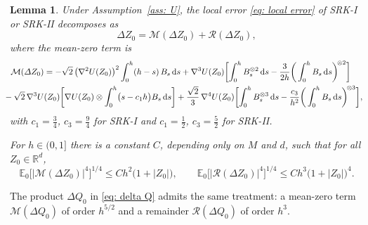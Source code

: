 \documentclass[namedate,webpdf,imanum]{ima-authoring-template}
\newcommand{\Le}{\leqslant}
\newcommand{\D}{\mathrm{d}}
\theoremstyle{thmstyletwo}
\newtheorem{lemma}{Lemma}
\numberwithin{equation}{section}
\begin{document}
\begin{lemma}
\label{lem: martingale rep}
    Under Assumption~\ref{ass: U}, the local error \eqref{eq: local error} of SRK-I or SRK-II decomposes as
    \begin{equation}
        \Delta Z_0 = \mathcal M(\Delta Z_0) + \mathcal R(\Delta Z_0) ,
        \label{eq: local decomposition}
    \end{equation}
    where the mean-zero term is
\begin{align}
    & \mathcal M(\Delta Z_0) = - \sqrt2\, \bigl( \nabla^2 U(Z_0) \bigr)^2 \int_0^h (h-s)\, B_s\,\D s
    + \nabla^3 U(Z_0) \biggl[ \int_0^h B_s^{\otimes 2}\,\D s - \frac{3}{2h} \bigg( \int_0^h B_s\,\D s \bigg)^{\!\otimes 2} \biggr] \notag \\
    & \hspace{-0.3cm}- \sqrt2\, \nabla^3 U(Z_0) \biggl[ \nabla U(Z_0) \otimes \int_0^h \bigl( s - c_1 h \bigr) B_s\,\D s \biggr]
    + \frac{\sqrt2}{3}\, \nabla^4 U(Z_0) \biggl[ \int_0^h B_s^{\otimes 3}\,\D s - \frac{c_3}{h^2} \bigg( \int_0^h B_s\,\D s \bigg)^{\!\otimes 3} \biggr] ,
    \label{eq: martingale Z}
\end{align}
    with $c_1 = \frac34$, $c_3 = \frac94$ for SRK-I and $c_1 = \frac12$, $c_3 = \frac52$ for SRK-II.
    
    For $h \in (0, 1]$ there is a constant $C$, depending only on $M$ and $d$, such that for all $Z_0 \in \mathbb R^d$,
    \begin{equation}
        \mathbb E_0\bigl[ |\mathcal M(\Delta Z_0)|^4 \bigr]^{1/4} \Le C h^2 \bigl( 1 + |Z_0| \bigr) , \qquad
        \mathbb E_0\bigl[ |\mathcal R(\Delta Z_0)|^4 \bigr]^{1/4} \Le C h^3 \bigl( 1 + |Z_0| \bigr)^4 .
        \label{eq: local moments}
    \end{equation}
\end{lemma}
The product $\Delta Q_0$ in \eqref{eq: delta Q} admits the same treatment: a mean-zero term $\mathcal M(\Delta Q_0)$ of order $h^{5/2}$ and a remainder $\mathcal R(\Delta Q_0)$ of order $h^3$.
\end{document}
